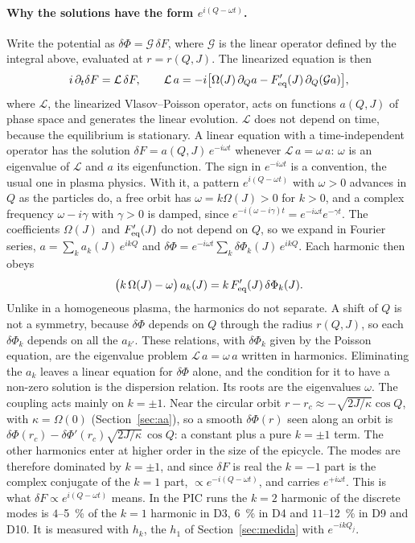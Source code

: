 \documentclass[11pt,a4paper]{article}
\begin{document}
\paragraph{Why the solutions have the form $e^{i(Q-\omega t)}$.} Write the potential as
$\delta\Phi=\mathcal G\,\delta F$, where $\mathcal G$ is the linear operator defined by the integral
above, evaluated at $r=r(Q,J)$. The linearized equation is then
\[
  i\,\partial_t\delta F=\mathcal L\,\delta F,\qquad
  \mathcal L\,a=-i\big[\Omega(J)\,\partial_Qa-F_{\rm eq}'(J)\,\partial_Q(\mathcal G a)\big],
\]
where $\mathcal L$, the linearized Vlasov--Poisson operator, acts on functions $a(Q,J)$ of
phase space and generates the linear evolution. $\mathcal L$ does not depend on time,
because the equilibrium is stationary. A linear equation with a time-independent operator
has the solution $\delta F=a(Q,J)\,e^{-i\omega t}$ whenever $\mathcal L\,a=\omega\,a$: $\omega$ is an
eigenvalue of $\mathcal L$ and $a$ its eigenfunction. The sign in $e^{-i\omega t}$ is a
convention, the usual one in plasma physics. With it, a pattern $e^{i(Q-\omega t)}$ with
$\omega>0$ advances in $Q$ as the particles do, a free orbit has $\omega=k\Omega(J)>0$ for
$k>0$, and a complex frequency $\omega-i\gamma$ with $\gamma>0$ is damped, since
$e^{-i(\omega-i\gamma)t}=e^{-i\omega t}e^{-\gamma t}$. The coefficients $\Omega(J)$ and
$F_{\rm eq}'(J)$ do not depend on $Q$, so we expand in Fourier series,
$a=\sum_ka_k(J)\,e^{ikQ}$ and $\delta\Phi=e^{-i\omega t}\sum_k\delta\Phi_k(J)\,e^{ikQ}$. Each
harmonic then obeys
\[
  \big(k\,\Omega(J)-\omega\big)\,a_k(J)=k\,F_{\rm eq}'(J)\,\delta\Phi_k(J).
\]
Unlike in a homogeneous plasma, the harmonics do not separate. A shift of $Q$ is not a
symmetry, because $\delta\Phi$ depends on $Q$ through the radius $r(Q,J)$, so each
$\delta\Phi_k$ depends on all the $a_{k'}$. These relations, with $\delta\Phi_k$ given by the Poisson
equation, are the eigenvalue problem $\mathcal L\,a=\omega\,a$ written in harmonics. Eliminating
the $a_k$ leaves a linear equation for $\delta\Phi$ alone, and the condition for it to have a
non-zero solution is the dispersion relation. Its roots are the eigenvalues $\omega$. The
coupling acts mainly on $k=\pm1$. Near the circular
orbit $r-r_c\approx-\sqrt{2J/\kappa}\cos Q$, with $\kappa=\Omega(0)$ (Section~\ref{sec:aa}), so a
smooth $\delta\Phi(r)$ seen along an orbit is $\delta\Phi(r_c)-\delta\Phi'(r_c)\sqrt{2J/\kappa}\,\cos Q$:
a constant plus a pure $k=\pm1$ term. The other harmonics enter at higher order in the
size of the epicycle. The modes are therefore dominated by $k=\pm1$, and since $\delta F$ is
real the $k=-1$ part is the complex conjugate of the $k=1$ part, $\propto e^{-i(Q-\omega t)}$,
and carries $e^{+i\omega t}$. This is what
$\delta F\propto e^{i(Q-\omega t)}$ means. In the PIC runs the $k=2$ harmonic of the discrete
modes is $4$--\SI{5}{\%} of the $k=1$ harmonic in D3, \SI{6}{\%} in D4 and $11$--\SI{12}{\%} in
D9 and D10. It is measured with $h_k$, the $h_1$ of Section~\ref{sec:medida} with $e^{-ikQ_j}$.
\end{document}
